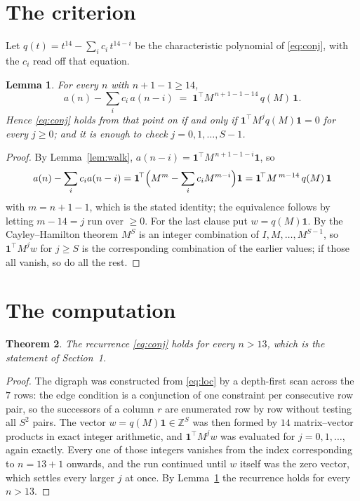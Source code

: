 \documentclass[11pt,a4paper]{article}
\theoremstyle{plain}
\newtheorem{theorem}{Theorem}
\newtheorem{lemma}[theorem]{Lemma}
\theoremstyle{definition}
\begin{document}
\section{The criterion}

Let $q(t)=t^{14}-\sum_i c_i\,t^{14-i}$ be the characteristic polynomial of
\eqref{eq:conj}, with the $c_i$ read off that equation.

\begin{lemma}\label{lem:crit}
For every $n$ with $n+1-1\ge14$,
\[
a(n)-\sum_i c_i\,a(n-i)\;=\;\mathbf{1}^{\!\top}M^{\,n+1-1-14}\,q(M)\,\mathbf{1} .
\]
Hence \eqref{eq:conj} holds from that point on if and only if
$\mathbf{1}^{\!\top}M^{j}q(M)\mathbf{1}=0$ for every $j\ge0$; and it is enough to check
$j=0,1,\dots,S-1$.
\end{lemma}

\begin{proof}
By Lemma~\ref{lem:walk}, $a(n-i)=\mathbf{1}^{\!\top}M^{\,n+1-1-i}\mathbf{1}$, so
\[
a(n)-\sum_i c_i a(n-i)
=\mathbf{1}^{\!\top}\Bigl(M^{m}-\sum_i c_i M^{m-i}\Bigr)\mathbf{1}
=\mathbf{1}^{\!\top}M^{\,m-14}\,q(M)\,\mathbf{1}
\]
with $m=n+1-1$, which is the stated identity; the equivalence follows by letting
$m-14=j$ run over $\ge0$. For the last clause put $w=q(M)\mathbf{1}$. By the
Cayley--Hamilton theorem $M^{S}$ is an integer combination of $I,M,\dots,M^{S-1}$, so
$\mathbf{1}^{\!\top}M^{j}w$ for $j\ge S$ is the corresponding combination of the earlier
values; if those all vanish, so do all the rest.
\end{proof}

\section{The computation}

\begin{theorem}
The recurrence \eqref{eq:conj} holds for every $n>13$, which is the statement of
Section~1.
\end{theorem}

\begin{proof}
The digraph was constructed from \eqref{eq:loc} by a depth-first scan across the $7$
rows: the edge condition is a conjunction of one constraint per consecutive row
pair, so the successors of a column $r$ are enumerated row by row without testing all
$S^2$ pairs. The vector $w=q(M)\mathbf{1}\in\mathbb{Z}^{S}$ was then formed by $14$
matrix--vector products in exact integer arithmetic, and $\mathbf{1}^{\!\top}M^{j}w$ was
evaluated for $j=0,1,\dots$, again exactly. Every one of those integers vanishes from the
index corresponding to $n=13+1$ onwards, and the run continued until $w$ itself was the
zero vector, which settles every larger $j$ at once. By Lemma~\ref{lem:crit} the recurrence
holds for every $n>13$.
\end{proof}
\end{document}
